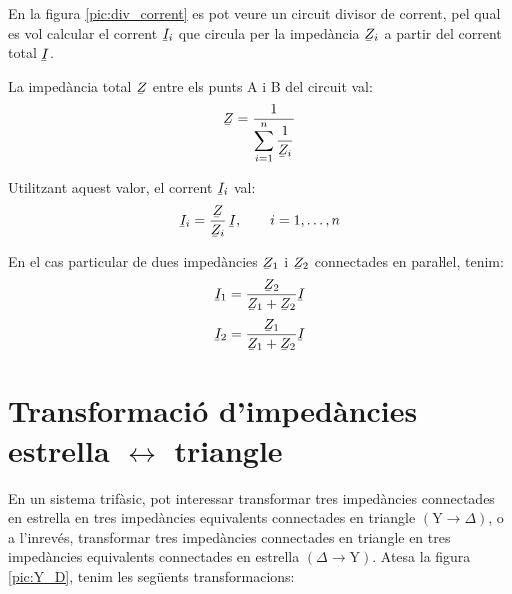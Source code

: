 En la figura \vref{pic:div_corrent} es pot veure un circuit divisor
de corrent, pel qual es vol calcular el corrent $\cmplx{I}_i$ que
circula per la impedància $\cmplx{Z}_i$ a partir del corrent total
$\cmplx{I}$.
\begin{center}
	\centering
    
    \label{pic:div_corrent}
\end{center}

La impedància total $\cmplx{Z}$ entre els punts A i B del circuit val:
\begin{equation}\label{eq:z_parallel}
    \cmplx{Z} = \frac{1}{\displaystyle\sum_{i=1}^n \frac{1}{\cmplx{Z}_i}}
\end{equation}

Utilitzant aquest valor, el corrent $\cmplx{I}_i$ val:
\begin{equation}
    \cmplx{I}_i = \frac{\cmplx{Z}}{\cmplx{Z}_i}\,\cmplx{I}, \qquad i=1,\dots,n\label{eq:div_corrent}
\end{equation}

En el cas particular de dues impedàncies $\cmplx{Z}_1$ i $\cmplx{Z}_2$ connectades en paraŀlel, tenim:
\begin{subequations}
\begin{align}
    \cmplx{I}_1 &= \frac{\cmplx{Z}_2}{\cmplx{Z}_1+\cmplx{Z}_2} \cmplx{I}  \\[0.5ex]
    \cmplx{I}_2 &= \frac{\cmplx{Z}_1}{\cmplx{Z}_1+\cmplx{Z}_2} \cmplx{I}
\end{align}
\end{subequations}


\section{\texorpdfstring{Transformació d'impedàncies estrella $\boldsymbol{\leftrightarrow}$ triangle}
    {Transformació estrella-triangle d'impedàncies}}\label{secc:d_y} 

En un sistema trifàsic, pot interessar transformar tres impedàncies connectades en
estrella en tres impedàncies equivalents connectades en triangle
$(\text{Y}\rightarrow\Delta)$, o a l'inrevés, transformar tres impedàncies connectades en
triangle en tres impedàncies equivalents connectades en estrella
$(\Delta\rightarrow\text{Y})$. Atesa la figura \vref{pic:Y_D}, tenim les següents
transformacions:

